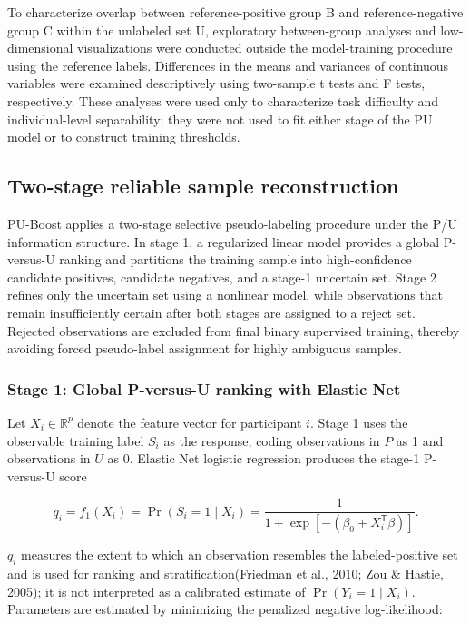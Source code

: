 \documentclass[10pt]{article}
\begin{document}
To characterize overlap between reference-positive group B and
reference-negative group C within the unlabeled set U, exploratory
between-group analyses and low-dimensional visualizations were conducted
outside the model-training procedure using the reference labels.
Differences in the means and variances of continuous variables were
examined descriptively using two-sample t tests and F tests,
respectively. These analyses were used only to characterize task
difficulty and individual-level separability; they were not used to fit
either stage of the PU model or to construct training thresholds.

\subsection{Two-stage reliable sample
reconstruction}\label{two-stage-reliable-sample-reconstruction}

PU-Boost applies a two-stage selective pseudo-labeling procedure under
the P/U information structure. In stage 1, a regularized linear model
provides a global P-versus-U ranking and partitions the training sample
into high-confidence candidate positives, candidate negatives, and a
stage-1 uncertain set. Stage 2 refines only the uncertain set using a
nonlinear model, while observations that remain insufficiently certain
after both stages are assigned to a reject set. Rejected observations
are excluded from final binary supervised training, thereby avoiding
forced pseudo-label assignment for highly ambiguous samples.

\subsubsection{Stage 1: Global P-versus-U ranking with Elastic Net}\label{stage-1-global-p-versus-u-ranking-with-elastic-net}

Let \(X_{i} \in \mathbb{R}^{p}\) denote the feature vector for
participant \(i\). Stage 1 uses the observable training label \(S_{i}\)
as the response, coding observations in \(P\) as 1 and observations in
\(U\) as 0. Elastic Net logistic regression produces the stage-1
P-versus-U score

\[q_{i} = f_{1}\left( X_{i} \right) = \Pr\left( S_{i} = 1 \mid X_{i} \right) = \frac{1}{1 + \exp\left\lbrack - \left( \beta_{0} + X_{i}^{\mathsf{T}}\beta \right) \right\rbrack}.\]

\(q_{i}\) measures the extent to which an observation resembles the
labeled-positive set and is used for ranking and stratification(Friedman
et al., 2010; Zou \& Hastie, 2005); it is not interpreted as a
calibrated estimate of \(\Pr\left( Y_{i} = 1 \mid X_{i} \right)\).
Parameters are estimated by minimizing the penalized negative
log-likelihood:
\end{document}
